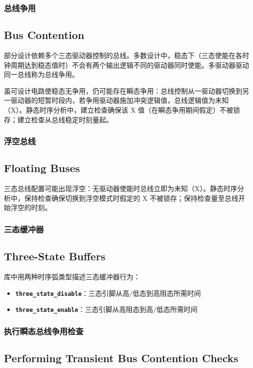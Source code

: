 \subsubsection{总线争用}
\subsection*{Bus Contention}

部分设计依赖多个三态驱动器控制的总线。多数设计中，稳态下（三态使能在各时钟周期达到稳态值时）不会有两个输出逻辑不同的驱动器同时使能。多驱动器驱动同一总线称为总线争用。

虽可设计电路使稳态无争用，仍可能存在瞬态争用：总线控制从一驱动器切换到另一驱动器的短暂时段内，若争用驱动器施加冲突逻辑值，总线逻辑值为未知（X）。静态时序分析中，建立检查确保该 X 值（在瞬态争用期间假定）不被锁存；建立检查从总线稳定时刻量起。

\subsubsection{浮空总线}
\subsection*{Floating Buses}

三态总线配置可能出现浮空：无驱动器使能时总线立即为未知（X）。静态时序分析中，保持检查确保切换到浮空模式时假定的 X 不被锁存；保持检查量至总线开始浮空的时刻。

\subsubsection{三态缓冲器}
\subsection*{Three-State Buffers}

库中用两种时序弧类型描述三态缓冲器行为：
\begin{itemize}
  \item \textbf{\texttt{three\_state\_disable}}：三态引脚从高/低态到高阻态所需时间
  \item \textbf{\texttt{three\_state\_enable}}：三态引脚从高阻态到高/低态所需时间
\end{itemize}

\subsubsection{执行瞬态总线争用检查}
\subsection*{Performing Transient Bus Contention Checks}

